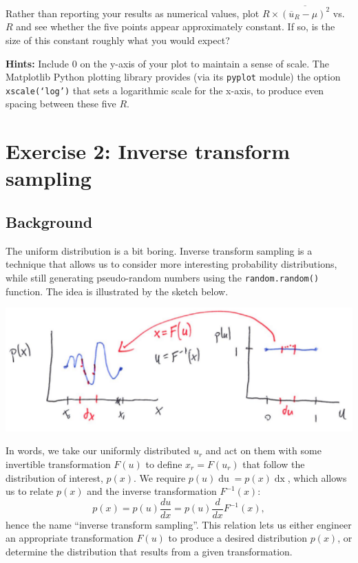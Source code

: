 \documentclass[12 pt]{article} %
\newcommand{\ubar}{\ensuremath{\overline u} }
\renewcommand{\d}[1]{\ensuremath{\mathop{d#1}} }
\newcommand{\showmarks}[1]{\rightline{\texttt{[#1 marks]}}} %
\begin{document}
Rather than reporting your results as numerical values, plot $R \times \overline{\left(\ubar_R - \mu\right)^2}$ vs.\ $R$ and see whether the five points appear approximately constant.
If so, is the size of this constant roughly what you would expect?

\textbf{Hints:} Include $0$ on the y-axis of your plot to maintain a sense of scale.
The Matplotlib Python plotting library provides (via its \texttt{pyplot} module) the option \texttt{xscale(`log')} that sets a logarithmic scale for the x-axis, to produce even spacing between these five $R$.

\showmarks{8}
\vfill



\newpage %
\section*{Exercise 2: Inverse transform sampling}
\subsection*{Background}
The uniform distribution is a bit boring.
Inverse transform sampling is a technique that allows us to consider more interesting probability distributions, while still generating pseudo-random numbers using the \texttt{random.random()} function.
The idea is illustrated by the sketch below.
\begin{center}
  \includegraphics[width=\textwidth]{figs/sampling.pdf}
\end{center}

In words, we take our uniformly distributed $u_r$ and act on them with some invertible transformation $F(u)$ to define $x_r = F(u_r)$ that follow the distribution of interest, $p(x)$.
We require $p(u) \d{u} = p(x) \d{x}$, which allows us to relate $p(x)$ and the inverse transformation $F^{-1}(x)$:
\begin{equation}
  \label{eq:inverse}
  p(x) = p(u) \frac{du}{dx} = p(u) \frac{d}{dx} F^{-1}(x),
\end{equation}
hence the name ``inverse transform sampling''.
This relation lets us either engineer an appropriate transformation $F(u)$ to produce a desired distribution $p(x)$, or determine the distribution that results from a given transformation.
\end{document}
